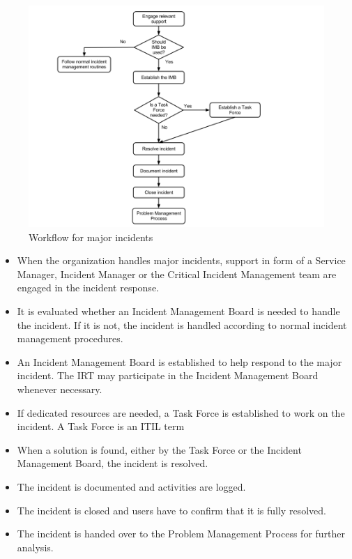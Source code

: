 \begin{figure}[H]
\hspace{-1.1cm}\includegraphics[scale=0.53]{WorkflowcaseCMAJOR.png}
\caption[Workflow for major incidents, Case B]{Workflow for major incidents}
\label{fig:workflowcaseCmajor}
\end{figure}

\begin{itemize}
\item When the organization handles major incidents, support in form of a Service Manager, Incident Manager or the Critical Incident Management team are engaged in the incident response.
\item It is evaluated whether an Incident Management Board is needed to handle the incident. If it is not, the incident is handled according to normal incident management procedures.
\item An Incident Management Board is established to help respond to the major incident. The \ac{IRT} may participate in the Incident Management Board whenever necessary.
\item If dedicated resources are needed, a Task Force is established to work on the incident. A Task Force is an ITIL term
\item When a solution is found, either by the Task Force or the Incident Management Board, the incident is resolved.
\item The incident is documented and activities are logged.
\item The incident is closed and users have to confirm that it is fully resolved.
\item The incident is handed over to the Problem Management Process for further analysis.  
\end{itemize}


